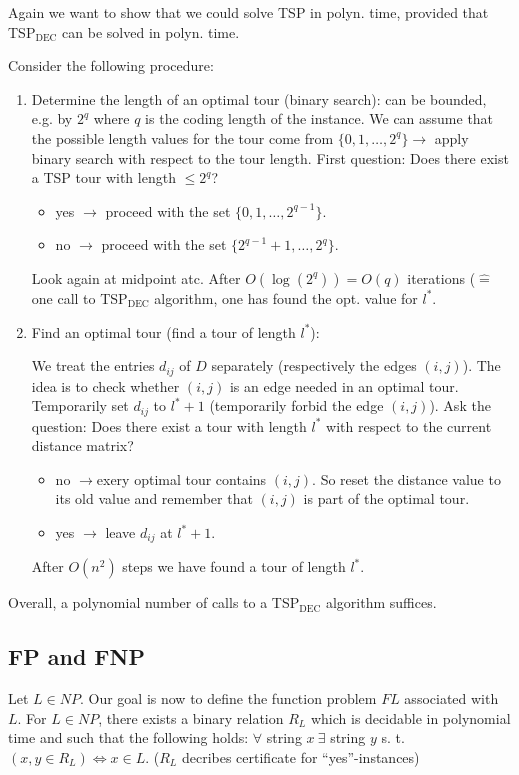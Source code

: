 \documentclass[11pt]{article}
\theoremstyle{definition}
\theoremstyle{definition}
\begin{document}
Again we want to show that we could solve TSP in polyn. time, provided that TSP$_\text{DEC}$ can be solved in polyn. time.

Consider the following procedure:
\begin{enumerate}
\item Determine the length of an optimal tour (binary search): can be bounded, e.g. by $ 2^q $ where $ q $ is the coding length of the instance. We can assume that the possible length values for the tour come from $ \{0, 1, \dots, 2^q\} \rightarrow $ apply binary search with respect to the tour length. First question: Does there exist a TSP tour with length $ \leq 2^q $?
	\begin{itemize}
	\item yes $ \rightarrow $ proceed with the set $ \{0, 1, \dots, 2^{q-1}\} $.
	\item no $ \rightarrow $ proceed with the set $ \{2^{q-1} + 1, \dots, 2^{q}\} $.
	\end{itemize}
	 Look again at midpoint atc. After $ O(\log(2^q)) = O(q) $ iterations ($ \hat = $ one call to TSP$_{\text{DEC}}$ algorithm, one has found the opt. value for $ l^\ast $.
	 
\item Find an optimal tour (find a tour of length $ l^\ast$):

We treat the entries $ d_{ij} $ of $ D $ separately (respectively the edges $( i, j )$). The idea is to check whether $ (i, j) $ is an edge needed in an optimal tour. Temporarily set $ d_{ij} $ to $ l^\ast + 1 $ (temporarily forbid the edge $ (i, j )$). Ask the question: Does there exist a tour with length $ l^\ast $ with respect to the current distance matrix?
	\begin{itemize}
	\item no $ \rightarrow $exery optimal tour contains $ (i, j) $. So reset the distance value to its old value and remember that $ (i, j) $ is part of the optimal tour.
	\item yes $ \rightarrow $ leave $ d_{ij} $ at $ l^\ast + 1 $.
	\end{itemize}
After $ O(n^2) $ steps we have found a tour of length $ l^\ast $.
\end{enumerate}

Overall, a polynomial number of calls to a TSP$_{\text{DEC}}$ algorithm suffices.

\subsection{FP and FNP}
Let $ L \in NP $. Our goal is now to define the function problem $ FL $ associated with $ L $. For $ L \in NP $, there exists a binary relation $ R_L $ which is decidable in polynomial time and such that the following holds:
$ \forall $ string $ x ~\exists $ string $ y $ s. t. $ (x, y \in R_L) \Leftrightarrow x \in L $. ($ R_L $ decribes certificate for ``yes''-instances)
\end{document}
